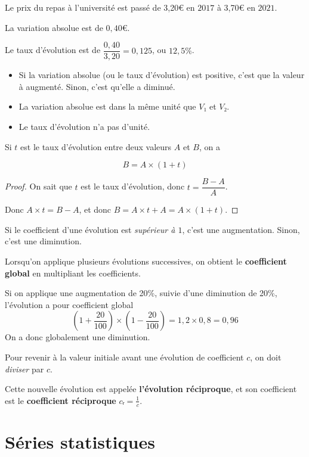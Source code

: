 \documentclass[
	classe=$2^{de}$
]{coursclass}
\begin{document}
\begin{exemple}
	Le prix du repas à l'université est passé de 3,20€ en $2017$ à 3,70€ en $2021$.

	La variation absolue est de $0,40€$.

	Le taux d'évolution est de $\dfrac{0,40}{3,20} = 0,125$, ou $12,5\%$.
\end{exemple}

\begin{remarque}
	\begin{itemize}
		\item Si la variation absolue (ou le taux d'évolution) est positive, c'est que la valeur à augmenté. Sinon, c'est qu'elle a diminué.
		\item La variation absolue est dans la même unité que $V₁$ et $V₂$.
		\item Le taux d'évolution n'a pas d'unité.
	\end{itemize}
\end{remarque}

\begin{propriete}
	Si $t$ est le taux d'évolution entre deux valeurs $A$ et $B$, on a

	$$ B = A × (1 + t) $$
\end{propriete}
\begin{proof}
	On sait que $t$ est le taux d'évolution, donc $t = \dfrac{B - A}{A}$.

	Donc $A × t = B - A$, et donc
	$B = A × t + A = A × (1 + t)$.
\end{proof}

\begin{remarque}
	Si le coefficient d'une évolution est \textit{supérieur à $1$}, c'est une augmentation. Sinon, c'est une diminution.
\end{remarque}

\begin{propriete}
	Lorsqu'on applique plusieurs évolutions successives, on obtient le \textbf{coefficient global} en multipliant les coefficients.
\end{propriete}

\begin{exemple}
	Si on applique une augmentation de 20\%, suivie d'une diminution de 20\%, l'évolution a pour coefficient global
	$$ \left(1 + \frac{20}{100}\right) × \left(1 - \frac{20}{100}\right) = 1,2 × 0,8 = 0,96 $$
	On a donc globalement une diminution.
\end{exemple}

\begin{propriete}
	Pour revenir à la valeur initiale avant une évolution de coefficient $c$, on doit \textit{diviser} par $c$.

	Cette nouvelle évolution est appelée \textbf{l'évolution réciproque}, et son coefficient est le \textbf{coefficient réciproque} $cᵣ = \frac{1}{c}$.
\end{propriete}

\section{Séries statistiques}
\end{document}
